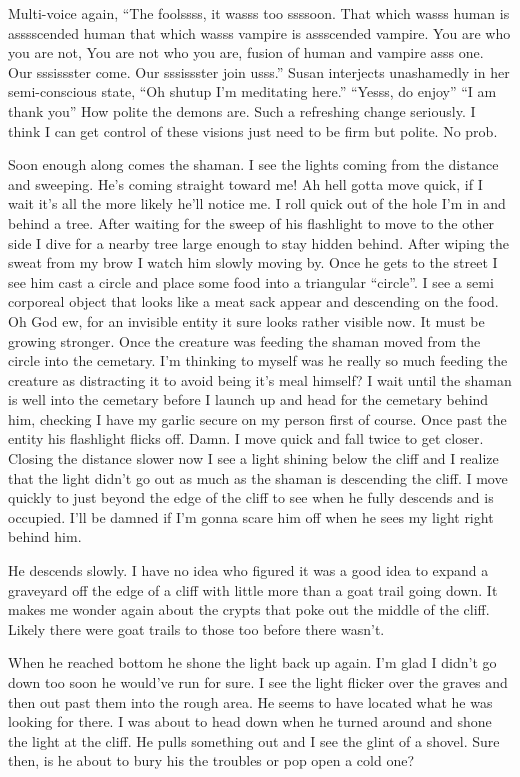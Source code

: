Multi-voice again, ``The foolssss, it wasss too ssssoon. That which wasss human is asssscended human that which wasss vampire is assscended vampire. You are who you are not, You are not who you are, fusion of human and vampire asss one. Our sssissster come. Our sssissster join usss.''
Susan interjects unashamedly in her semi-conscious state, ``Oh shutup I'm meditating here.''
``Yesss, do enjoy''
``I am thank you''
How polite the demons are. Such a refreshing change seriously. I think I can get control of these visions just need to be firm but polite. No prob.

Soon enough along comes the shaman. I see the lights coming from the distance and sweeping. He's coming straight toward me! Ah hell gotta move quick, if I wait it's all the more likely he'll notice me. I roll quick out of the hole I'm in and behind a tree. After waiting for the sweep of his flashlight to move to the other side I dive for a nearby tree large enough to stay hidden behind. After wiping the sweat from my brow I watch him slowly moving by. Once he gets to the street I see him cast a circle and place some food into a triangular ``circle''. I see a semi corporeal object that looks like a meat sack appear and descending on the food. Oh God ew, for an invisible entity it sure looks rather visible now. It must be growing stronger. Once the  creature was feeding the shaman moved from the circle into the cemetary. I'm thinking to myself was he really so much feeding the creature as distracting it to avoid being it's meal himself? I wait until the shaman is well into the  cemetary before I launch up and head for the cemetary behind him, checking I have my garlic secure on my person first of course. Once past the entity his flashlight flicks off. Damn. I move quick and fall twice to get closer. Closing the distance slower now I see a light shining below the cliff and I realize that the light didn't go out as much as the shaman is descending the cliff. I move quickly to just beyond the edge of the cliff to see when he fully descends and is occupied. I'll be damned if I'm gonna scare him off when he sees my light right behind him.

He descends slowly. I have no idea who figured it was a good idea to expand a graveyard off the edge of a cliff with little more than a goat trail going down. It makes me wonder again about the crypts that poke out the middle of the cliff. Likely there were goat trails to those too before there wasn't. 

When he reached bottom he shone the light back up again. I'm glad I didn't go down too soon he would've run for sure. I see the light flicker over the graves and then out past them into the rough area. He seems to have located what he was looking for there. I was about to head down when he turned around and shone the light at the cliff. He pulls something  out and I see the glint of a shovel. Sure then, is he about to bury his the troubles or pop open a cold one?

